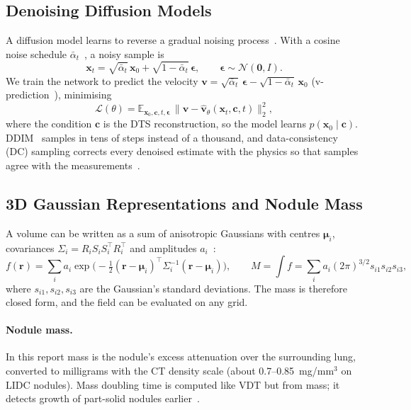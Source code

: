 \subsection{Denoising Diffusion Models}
 A diffusion model learns to reverse a gradual noising process~\cite{ho2020ddpm}. With a cosine noise schedule $\bar\alpha_t$~\cite{nichol2021improved}, a noisy sample is
\begin{equation}
  \mathbf{x}_t = \sqrt{\bar\alpha_t}\,\mathbf{x}_0 + \sqrt{1-\bar\alpha_t}\,\boldsymbol\epsilon, \qquad \boldsymbol\epsilon\sim\mathcal{N}(\mathbf{0},I).
\end{equation}
We train the network to predict the velocity $\mathbf{v} = \sqrt{\bar\alpha_t}\,\boldsymbol\epsilon - \sqrt{1-\bar\alpha_t}\,\mathbf{x}_0$ (v-prediction~\cite{salimans2022v}), minimising
\begin{equation}
  \mathcal{L}(\theta) = \mathbb{E}_{\mathbf{x}_0,\mathbf{c},t,\boldsymbol\epsilon}\, \big\| \mathbf{v} - \hat{\mathbf{v}}_\theta(\mathbf{x}_t, \mathbf{c}, t)\big\|_2^2 ,
\end{equation}
where the condition $\mathbf{c}$ is the DTS reconstruction, so the model learns $p(\mathbf{x}_0\mid\mathbf{c})$. DDIM~\cite{song2021ddim} samples in tens of steps instead of a thousand, and data-consistency (DC) sampling corrects every denoised estimate with the physics so that samples agree with the measurements~\cite{chung2023dps,chung2024dds}.

\subsection{3D Gaussian Representations and Nodule Mass}
 A volume can be written as a sum of anisotropic Gaussians with centres $\boldsymbol\mu_i$, covariances $\Sigma_i = R_i S_i S_i^{\top} R_i^{\top}$ and amplitudes $a_i$~\cite{kerbl2023gs,zha2024r2}:
\begin{equation}
  f(\mathbf{r}) = \sum_i a_i \exp\!\Big(-\tfrac12(\mathbf{r}-\boldsymbol\mu_i)^{\top}\Sigma_i^{-1}(\mathbf{r}-\boldsymbol\mu_i)\Big),
  \qquad
  M = \int f = \sum_i a_i (2\pi)^{3/2} s_{i1}s_{i2}s_{i3},
  \label{eq:gaussmass}
\end{equation}
where $s_{i1},s_{i2},s_{i3}$ are the Gaussian's standard deviations. The mass is therefore closed form, and the field can be evaluated on any grid.

\paragraph{Nodule mass.} In this report mass is the nodule's excess attenuation over the surrounding lung, converted to milligrams with the CT density scale (about 0.7--0.85~mg/mm$^3$ on LIDC nodules). Mass doubling time is computed like VDT but from mass; it detects growth of part-solid nodules earlier~\cite{dehoop2010}.

